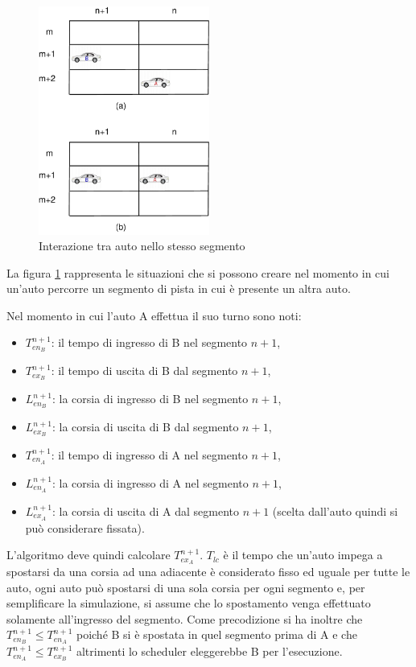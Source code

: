 \documentclass[11pt,a4paper]{report}
\begin{document}
\begin{center}
\begin{figure}
\includegraphics[width=0.5\textwidth]{diagrammi/Surpass}
\caption{Interazione tra auto nello stesso segmento}
\label{fig:surpass}
\end{figure}
\end{center}
La figura \ref{fig:surpass} rappresenta le situazioni che si possono creare nel momento in cui un'auto percorre un segmento di pista in cui è presente un altra auto.

Nel momento in cui l'auto A effettua il suo turno sono noti:
\begin{itemize}
\item $T_{en_B}^{n+1}$: il tempo di ingresso di B nel segmento $n+1$,
\item $T_{ex_B}^{n+1}$: il tempo di uscita di B dal segmento $n+1$,
\item $L_{en_B}^{n+1}$: la corsia di ingresso di B nel segmento $n+1$,
\item $L_{ex_B}^{n+1}$: la corsia di uscita di B dal segmento $n+1$,
\item $T_{en_A}^{n+1}$: il tempo di ingresso di A nel segmento $n+1$,
\item $L_{en_A}^{n+1}$: la corsia di ingresso di A nel segmento $n+1$,
\item $L_{ex_A}^{n+1}$: la corsia di uscita di A dal segmento $n+1$ (scelta dall'auto quindi si può considerare fissata).
\end{itemize}
L'algoritmo deve quindi calcolare $T_{ex_A}^{n+1}$.
$T_{lc}$ è il tempo che un'auto impega a spostarsi da una corsia ad una adiacente è considerato fisso ed uguale per tutte le auto, ogni auto può spostarsi di una sola corsia per ogni segmento e, per semplificare la simulazione, si assume che lo spostamento venga effettuato solamente all'ingresso del segmento.
Come precodizione si ha inoltre che $T_{en_B}^{n+1} \leq T_{en_A}^{n+1}$ poiché B si è spostata in quel segmento prima di A e che $T_{en_A}^{n+1} \leq T_{ex_B}^{n+1}$ altrimenti lo scheduler eleggerebbe B per l'esecuzione.
\end{document}
